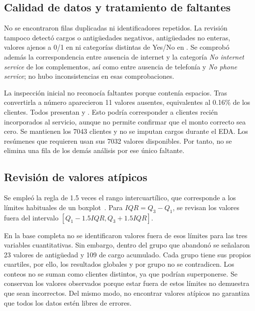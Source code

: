\subsection{Calidad de datos y tratamiento de faltantes}

No se encontraron filas duplicadas ni identificadores repetidos. La revisión tampoco detectó cargos o 
antigüedades negativos, antigüedades no enteras, valores ajenos a 0/1 en  ni categorías distintas de Yes/No en . Se comprobó además la correspondencia entre ausencia de internet y la categoría \emph{No internet service} de los complementos, así como entre ausencia de telefonía y \emph{No phone service}; no hubo inconsistencias en esas comprobaciones.

La inspección inicial no reconocía faltantes porque  contenía espacios. Tras convertirla a número aparecieron 11 valores ausentes, equivalentes al 0.16\% de los clientes. Todos presentan  y . Esto podría corresponder a clientes recién incorporados al servicio, aunque no permite confirmar que el monto correcto sea cero. Se mantienen los 7043 clientes y no se imputan cargos durante el EDA. Los resúmenes que requieren  usan sus 7032 valores disponibles. Por tanto, no se elimina una fila de los demás análisis por ese único faltante.

\subsection{Revisión de valores atípicos}
Se empleó la regla de 1.5 veces el rango intercuartílico, que corresponde a los límites habituales de un boxplot~\cite{nist}. Para $IQR=Q_3-Q_1$, se revisan los valores fuera del intervalo $[Q_1-1.5IQR,Q_3+1.5IQR]$.

En la base completa no se identificaron valores fuera de esos límites para las tres variables cuantitativas. Sin embargo, dentro del grupo que abandonó se señalaron 23 valores de antigüedad y 109 de cargo acumulado. Cada grupo tiene sus propios cuartiles, por ello, los resultados globales y por grupo no se contradicen. Los conteos no se suman como clientes distintos, ya que podrían superponerse. Se conservan los valores observados porque estar fuera de estos límites no demuestra que sean incorrectos. Del mismo modo, no encontrar valores atípicos no garantiza que todos los datos estén libres de errores.
